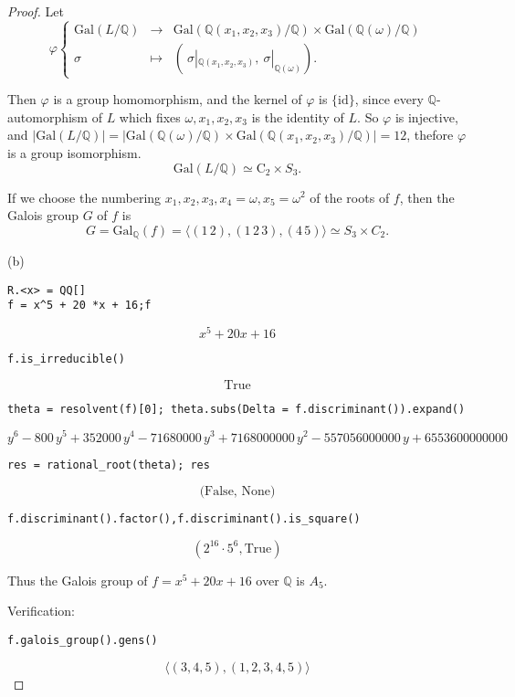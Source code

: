 \documentclass[11pt,a4paper]{article}
\newcommand{\Q}{\mathbb{Q}}
\newcommand{\Gal}{\mathrm{Gal}}
\begin{document}
\begin{proof}
Let
$$
\varphi
\left\{
\begin{array}{ccc}
 \Gal(L/\Q) & \to   &\Gal(\Q(x_1,x_2,x_3)/\Q)  \times  \Gal(\Q(\omega)/\Q)  \\
 \sigma & \mapsto  &    \left (\ \sigma|_{\Q(x_1,x_2,x_3)},\ \sigma |_{\Q(\omega)}\right).
\end{array}
\right.
$$

Then $\varphi$ is a group homomorphism, and the kernel of $\varphi$ is $\{\mathrm{id}\}$, since every $\Q$-automorphism of $L$ which fixes $\omega,x_1,x_2,x_3$ is the identity of $L$.
So $\varphi$ is injective, and $|\Gal(L/\Q)| = |\Gal(\Q(\omega)/\Q) \times \Gal(\Q(x_1,x_2,x_3)/\Q)| = 12$, thefore $\varphi$ is a group isomorphism.
$$\Gal(L/\Q) \simeq \mathrm{C}_2 \times S_3.$$

If we choose the numbering $x_1,x_2,x_3,x_4 = \omega, x_5 = \omega^2$ of the roots of $f$, then the Galois group $G$ of $f$ is
$$G = \Gal_{\Q}(f) = \langle (1\, 2), (1\,2\,3), (4 \, 5) \rangle \simeq S_3 \times C_2.$$

\item[(b)] 
\begin{verbatim}
R.<x> = QQ[]
f = x^5 + 20 *x + 16;f
\end{verbatim}
$$	
x^{5} + 20 x + 16
$$
\begin{verbatim}
f.is_irreducible()
\end{verbatim}
$$\text{True}$$
\begin{verbatim}
theta = resolvent(f)[0]; theta.subs(Delta = f.discriminant()).expand()
\end{verbatim}
$$y^{6} - 800 \, y^{5} + 352000 \, y^{4} - 71680000 \, y^{3} + 7168000000
\, y^{2} - 557056000000 \, y + 6553600000000
$$
\begin{verbatim}
res = rational_root(theta); res
\end{verbatim}
$$\text{(False, None)}$$
\begin{verbatim}
f.discriminant().factor(),f.discriminant().is_square()
\end{verbatim}

$$(2^{16} \cdot 5^{6}, \text{True})$$

Thus the Galois group of $f = x^5+20x+16$ over $\Q$ is $A_5$.

Verification:
\begin{verbatim}
f.galois_group().gens()
\end{verbatim}
$$\langle(3,4,5),(1,2,3,4,5)\rangle$$


\end{proof}
\end{document}
